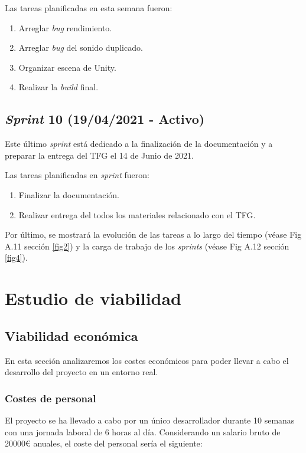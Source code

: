 Las tareas planificadas en esta semana fueron:
\begin{enumerate}
    \item Arreglar \textit{bug} rendimiento.
    \item Arreglar \textit{bug} del sonido duplicado. 
    \item Organizar escena de Unity. 
    \item Realizar la \textit{build} final.
\end{enumerate}
\subsection{\textit{Sprint} 10 (19/04/2021 - Activo)}
Este último \textit{sprint} está dedicado a la finalización de la documentación y a preparar la entrega del TFG el 14 de Junio de 2021.

Las tareas planificadas en \textit{sprint} fueron:
\begin{enumerate}
    \item Finalizar la documentación.
    \item Realizar entrega del todos los materiales relacionado con el TFG.
\end{enumerate}
Por último, se mostrará la evolución de las tareas a lo largo del tiempo (véase Fig A.11 sección \ref{fig2}) y la carga de trabajo de los \textit{sprints} (véase Fig A.12 sección \ref{fig4}).
\label{fig2}
\label{fig4}
\section{Estudio de viabilidad}
\subsection{Viabilidad económica}

En esta sección analizaremos los costes económicos para poder llevar a cabo el desarrollo del proyecto en un entorno real.

\subsubsection{Costes de personal}

El proyecto se ha llevado a cabo por un único desarrollador durante 10 semanas con una jornada laboral de 6 horas al día. Considerando un salario bruto de 20000€ anuales, el coste del personal sería el siguiente:

